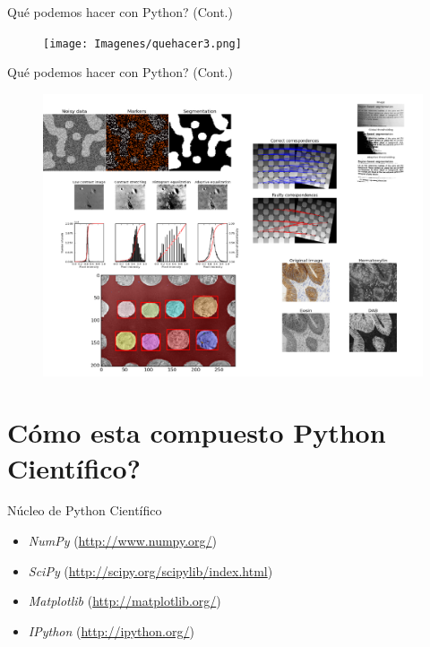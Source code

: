 \documentclass[xcolor=dvipsnames]{beamer}
\begin{document}
\begin{frame}{Qu\'e podemos hacer con Python? (Cont.)}

 \begin{figure}[h]
		\texttt{[image: Imagenes/quehacer3.png]}
\end{figure}
\end{frame}


\begin{frame}{Qu\'e podemos hacer con Python? (Cont.)}

 \begin{figure}[h]
		\includegraphics[scale = 0.22]{Imagenes/quehacer4.png}
\end{figure}
\end{frame}


\section{Cómo esta compuesto Python Científico?}
\begin{frame}{Núcleo de Python Científico}
	\begin{itemize}
	\item \emph{NumPy} (\url{http://www.numpy.org/})
	\item \emph{SciPy} (\url{http://scipy.org/scipylib/index.html})
	\item \emph{Matplotlib} (\url{http://matplotlib.org/})
	\item \emph{IPython} (\url{http://ipython.org/})
\end{itemize}
\end{frame}
\end{document}
